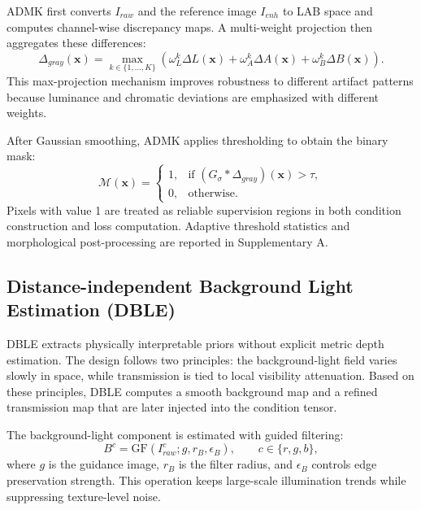 ADMK first converts $I_{raw}$ and the reference image $I_{enh}$ to LAB space and computes channel-wise discrepancy maps. A multi-weight projection then aggregates these differences:
\begin{equation}
\Delta_{gray}(\mathbf{x}) = \max_{k\in\{1,\dots,K\}}\left(\omega_L^k\Delta L(\mathbf{x}) + \omega_A^k\Delta A(\mathbf{x}) + \omega_B^k\Delta B(\mathbf{x})\right).
\label{eq:admk_gray}
\end{equation}
This max-projection mechanism improves robustness to different artifact patterns because luminance and chromatic deviations are emphasized with different weights.

After Gaussian smoothing, ADMK applies thresholding to obtain the binary mask:
\begin{equation}
\mathcal{M}(\mathbf{x}) =
\begin{cases}
1, & \text{if } (G_{\sigma} * \Delta_{gray})(\mathbf{x}) > \tau,\\
0, & \text{otherwise}.
\end{cases}
\label{eq:admk_binary}
\end{equation}
Pixels with value 1 are treated as reliable supervision regions in both condition construction and loss computation. Adaptive threshold statistics and morphological post-processing are reported in Supplementary A.

\subsection{Distance-independent Background Light Estimation (DBLE)}
\label{subsec:dble}

DBLE extracts physically interpretable priors without explicit metric depth estimation. The design follows two principles: the background-light field varies slowly in space, while transmission is tied to local visibility attenuation. Based on these principles, DBLE computes a smooth background map and a refined transmission map that are later injected into the condition tensor.

The background-light component is estimated with guided filtering:
\begin{equation}
B^c = \mathrm{GF}(I_{raw}^c; g, r_B, \epsilon_B),\qquad c\in\{r,g,b\},
\label{eq:dble_B_main}
\end{equation}
where $g$ is the guidance image, $r_B$ is the filter radius, and $\epsilon_B$ controls edge preservation strength. This operation keeps large-scale illumination trends while suppressing texture-level noise.

